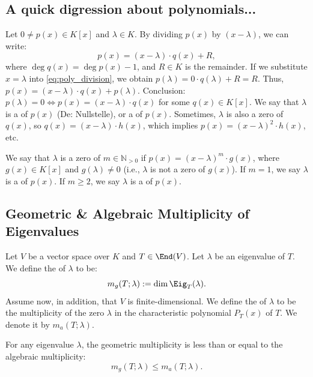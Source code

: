 \subsection{A quick digression about polynomials...}
Let $0 \ne p(x) \in K[x]$ and $\lambda \in K$. By dividing $p(x)$ by $(x-\lambda)$, we can write:
\begin{equation} \label{eq:poly_division}
  p(x) = (x-\lambda) \cdot q(x) + R,
\end{equation}
where $\deg q(x) = \deg p(x) - 1$, and $R \in K$ is the remainder.
If we substitute $x = \lambda$ into \eqref{eq:poly_division}, we obtain $p(\lambda) = 0 \cdot q(\lambda) + R = R$. Thus, $p(x) = (x-\lambda) \cdot q(x) + p(\lambda)$.
Conclusion: $p(\lambda) = 0 \iff p(x) = (x-\lambda) \cdot q(x)$ for some $q(x) \in K[x]$.
We say that $\lambda$ is a  of $p(x)$ (De: Nullstelle), or a  of $p(x)$.
Sometimes, $\lambda$ is also a zero of $q(x)$, so $q(x) = (x-\lambda) \cdot h(x)$, which implies $p(x) = (x-\lambda)^2 \cdot h(x)$, etc.

\begin{definition} \label{def:mult_zero}
  We say that $\lambda$ is a zero of  $m \in \mathbb{N}_{>0}$ if $p(x) = (x-\lambda)^m \cdot g(x)$, where $g(x) \in K[x]$ and $g(\lambda) \ne 0$ (i.e., $\lambda$ is not a zero of $g(x)$).
  If $m=1$, we say $\lambda$ is a  of $p(x)$.
  If $m \ge 2$, we say $\lambda$ is a  of $p(x)$.
\end{definition}

\subsection{Geometric \& Algebraic Multiplicity of Eigenvalues}

\begin{definition} \label{def:geom_alg_mult}
  Let $V$ be a vector space over $K$ and $T \in \End(V)$. Let $\lambda$ be an eigenvalue of $T$. We define the  of $\lambda$ to be:
  \[ m_g(T;\lambda) := \dim \Eig_T(\lambda). \]
  Assume now, in addition, that $V$ is finite-dimensional. We define the  of $\lambda$ to be the multiplicity of the zero $\lambda$ in the characteristic polynomial $P_T(x)$ of $T$. We denote it by $m_a(T;\lambda)$.
\end{definition}

\begin{proposition} \label{prop:mult_inequality}
  For any eigenvalue $\lambda$, the geometric multiplicity is less than or equal to the algebraic multiplicity:
  \[ m_g(T;\lambda) \le m_a(T;\lambda). \]
\end{proposition}

